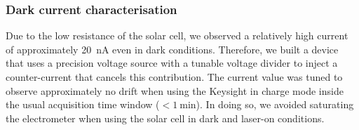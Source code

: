 
  

\subsubsection{Dark current characterisation}

Due to the low resistance of the solar cell, we observed a relatively high current of approximately \SI{20}{\nano\ampere} even in dark conditions. Therefore, we built a device that uses a precision voltage source with a tunable voltage divider to inject a counter-current that cancels this contribution. The current value was tuned to observe approximately no drift when using the Keysight in charge mode inside the usual acquisition time window ($< \SI{1}{\minute}$). In doing so, we avoided saturating the electrometer when using the solar cell in dark and laser-on conditions. 

